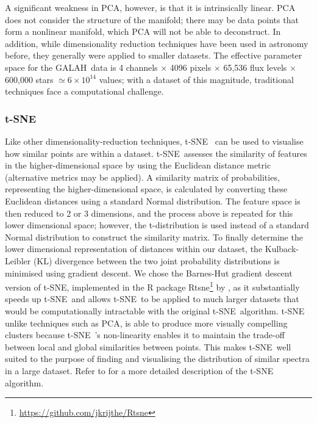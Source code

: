 \documentclass[]{aastex631}
\newcommand{\g}{GALAH\xspace}
\newcommand{\ts}{t-SNE\xspace}
\begin{document}
A significant weakness in PCA, however, is that it is intrinsically linear. PCA does not consider the structure of the manifold; there may be data points that form a nonlinear manifold, which PCA will not be able to deconstruct. 
In addition, while dimensionality reduction techniques have been used in astronomy before, they generally were applied to smaller datasets. The effective parameter space for the \g \ data is 4 channels $\times$ 4096 pixels $\times$ 65,536 flux levels $\times$ 600,000 stars $\simeq 6 \times 10^{14}$ values; with a dataset of this magnitude, traditional techniques face a computational challenge.



\subsubsection{\ts}

Like other dimensionality-reduction techniques, \ts \  \citep{maaten_visualizing_2008} can be used to visualise how similar points are within a dataset.
\ts \ assesses the similarity of features in the higher-dimensional space by using the Euclidean distance metric (alternative metrics may be applied). A similarity matrix of probabilities, representing the higher-dimensional space, is calculated by converting these Euclidean distances using a standard Normal distribution. The feature space is then reduced to 2 or 3 dimensions, and the process above is repeated for this lower dimensional space; however, the t-distribution is used instead of a standard Normal distribution to construct the similarity matrix. To finally determine the lower dimensional representation of distances within our dataset, the Kulback-Leibler (KL) divergence between the two joint probability distributions is minimised using gradient descent. We chose the Barnes-Hut gradient descent version of t-SNE, implemented in the R package Rtsne\footnote{\url{https://github.com/jkrijthe/Rtsne}} by \citet{Rtsne}, as it substantially speeds up \ts \ and  allows \ts \ to be applied to much larger datasets that would be computationally intractable with the original \ts \ algorithm.
\ts \, unlike techniques such as PCA, is able to produce more visually compelling clusters because \ts \ 's non-linearity enables it to maintain the trade-off between local and global similarities between points. This makes \ts \ well suited to the purpose of finding and visualising the distribution of similar spectra in a large dataset.
Refer to \cite{traven_galah_2017} for a more detailed description of the t-SNE algorithm.
\end{document}
